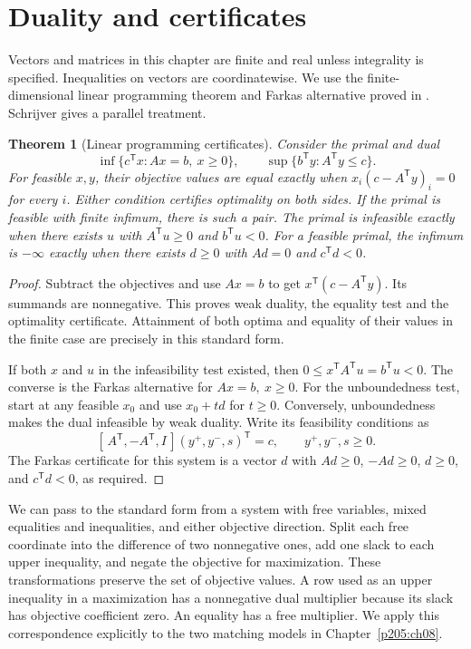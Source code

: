 \documentclass[11pt,oneside,openany]{book}
\theoremstyle{plain}
\newtheorem{theorem}{Theorem}[chapter]
\theoremstyle{definition}
\theoremstyle{remark}
\begin{document}
\section{Duality and certificates}

Vectors and matrices in this chapter are finite and real unless
integrality is specified. Inequalities on vectors are coordinatewise.
We use the finite-dimensional linear programming theorem and Farkas
alternative proved in \cite[Theorems 5.1 and 1.23]{p106}. Schrijver
\cite[vol.~A, Sections 5.4--5.6 and 13.2]{schrijver} gives a parallel
treatment.

\begin{theorem}[Linear programming certificates]\label{p205:W31}
Consider the primal and dual
\[
 \inf\{c^{\mathsf T}x:Ax=b,\ x\ge0\},
 \qquad
 \sup\{b^{\mathsf T}y:A^{\mathsf T}y\le c\}.
\]
For feasible \(x,y\), their objective values are equal exactly when
\(x_i(c-A^{\mathsf T}y)_i=0\) for every \(i\). Either condition certifies
optimality on both sides. If the primal is feasible with finite
infimum, there is such a pair. The primal is infeasible exactly when
there exists \(u\) with \(A^{\mathsf T}u\ge0\) and \(b^{\mathsf T}u<0\).
For a feasible primal, the infimum is \(-\infty\) exactly when there
exists \(d\ge0\) with \(Ad=0\) and \(c^{\mathsf T}d<0\).
\end{theorem}

\begin{proof}
Subtract the objectives and use \(Ax=b\) to get
\(x^{\mathsf T}(c-A^{\mathsf T}y)\). Its summands are nonnegative.
This proves weak duality, the equality test and the optimality
certificate. Attainment of both optima and equality of their values
in the finite case are precisely \cite[Theorem 5.1]{p106} in this
standard form.

If both \(x\) and \(u\) in the infeasibility test existed, then
\(0\le x^{\mathsf T}A^{\mathsf T}u=b^{\mathsf T}u<0\). The converse
is the Farkas alternative for \(Ax=b,\ x\ge0\).
For the unboundedness test, start at any feasible \(x_0\) and use
\(x_0+td\) for \(t\ge0\). Conversely, unboundedness makes the dual
infeasible by weak duality. Write its feasibility conditions as
\[
 [\,A^{\mathsf T},-A^{\mathsf T},I\,](y^+,y^-,s)^{\mathsf T}=c,
 \qquad y^+,y^-,s\ge0 .
\]
The Farkas certificate for this system is a vector \(d\) with
\(Ad\ge0\), \(-Ad\ge0\), \(d\ge0\), and \(c^{\mathsf T}d<0\),
as required.
\end{proof}

We can pass to the standard form from a system with free variables,
mixed equalities and inequalities, and either objective direction.
Split each free coordinate into the difference of two nonnegative
ones, add one slack to each upper inequality, and negate the
objective for maximization. These transformations preserve the set
of objective values. A row used as an upper inequality in a
maximization has a nonnegative dual multiplier because its slack
has objective coefficient zero. An equality has a free multiplier.
We apply this correspondence explicitly to the two matching models
in Chapter~\ref{p205:ch08}.
\end{document}
